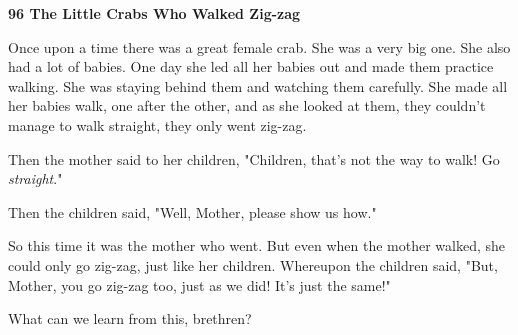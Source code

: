 
\textbf{96 The Little Crabs Who Walked Zig-zag}

Once upon a time there was a great female crab. She was a very big one. She also
had a lot of babies. One day she led all her babies out and made them practice
walking. She was staying behind them and watching them carefully. She made all
her babies walk, one after the other, and as she looked at them, they couldn't
manage to walk straight, they only went zig-zag.

Then the mother said to her children, "Children, that's not the way to
walk! Go \textit{straight}."

Then the children said, "Well, Mother, please show us how."

So this time it was the mother who went. But even when the mother walked, she could
only go zig-zag, just like her children. Whereupon the children said, "But,
Mother, you go zig-zag too, just as we did! It's just the same!"

What can we learn from this, brethren?


